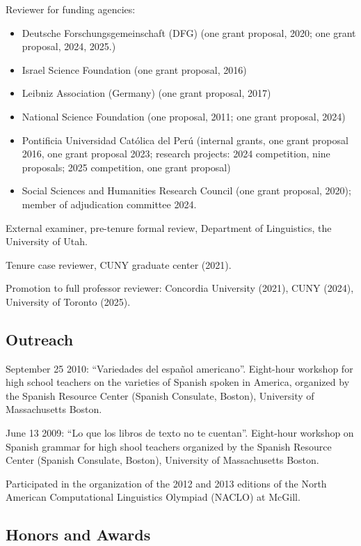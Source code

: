 \documentclass[11pt]{article}
\begin{document}
Reviewer for funding agencies:

\begin{itemize}
  \item[] Deutsche Forschungsgemeinschaft (DFG) (one grant proposal, 2020; one grant proposal, 2024, 2025.)
  \item[] Israel Science Foundation (one grant proposal, 2016)
  \item[] Leibniz Association (Germany) (one grant proposal, 2017)
  \item[] National Science Foundation (one proposal, 2011; one grant proposal, 2024)
  \item[] Pontificia Universidad Cat\'olica del Per\'u (internal grants, one grant proposal 2016, one grant proposal 2023; research projects: 2024 competition, nine proposals; 2025 competition, one grant proposal)
  \item[] Social Sciences and Humanities Research Council (one grant proposal, 2020); member of adjudication committee 2024.
  \end{itemize}


External examiner, pre-tenure formal review, Department of Linguistics, the University of Utah.

Tenure case reviewer, CUNY graduate center (2021).

Promotion to full professor reviewer: Concordia University (2021), CUNY (2024), University of Toronto (2025).


\subsection*{Outreach}


September 25 2010: ``Variedades del espa\~nol americano''. Eight-hour
workshop for high school teachers on the varieties of Spanish spoken in America, organized by the
Spanish Resource Center (Spanish Consulate, Boston), University of Massachusetts Boston.

June 13 2009: ``Lo que los libros de texto no te cuentan''. Eight-hour
workshop  on Spanish grammar for high shool teachers organized by the
Spanish Resource Center (Spanish Consulate, Boston), University of
Massachusetts Boston.

Participated in the organization of the 2012 and 2013 editions of the North
American Computational Linguistics Olympiad (NACLO) at McGill.


\subsection*{Honors and Awards} 
\end{document}
